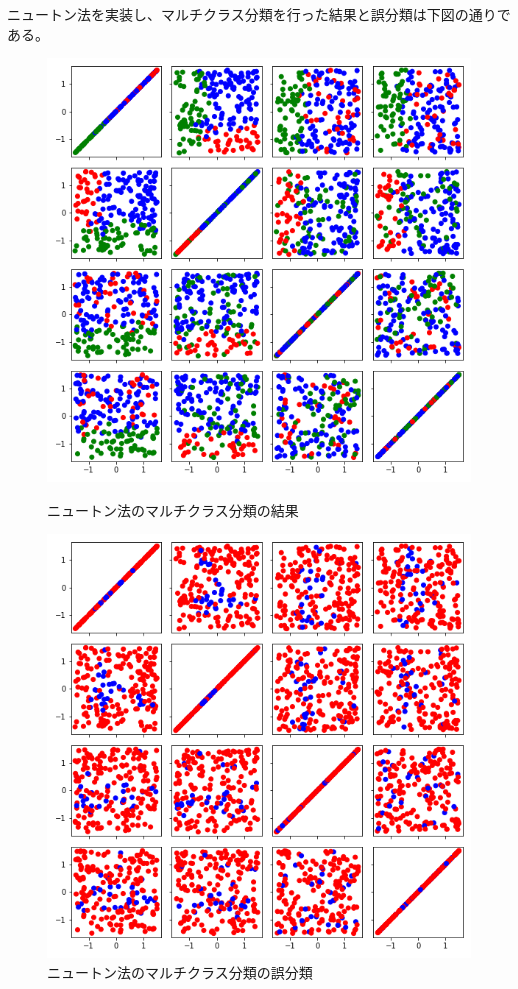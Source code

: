 \documentclass{jsarticle}
\begin{document}
\begin{enumerate}
  ニュートン法を実装し、マルチクラス分類を行った結果と誤分類は下図の通りである。
  \begin{figure}[htbp]
    \centering
    \begin{minipage}{0.4\linewidth}
      \centering
      \includegraphics[width=.9\textwidth]{image/1-4-3.png}
    \caption{ニュートン法のマルチクラス分類の結果}
    \end{minipage}
    \begin{minipage}{0.4\linewidth}
      \centering
      \includegraphics[width=.9\textwidth]{image/1-4-4.png}
    \caption{ニュートン法のマルチクラス分類の誤分類}
    \end{minipage}
  \end{figure}
  
\end{enumerate}
\end{document}
